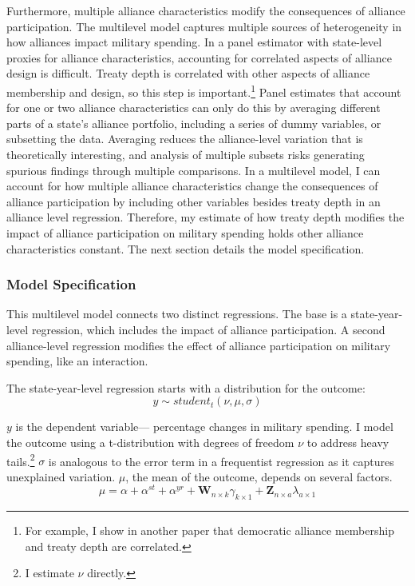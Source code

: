 \documentclass[12pt]{article}
\begin{document}
Furthermore, multiple alliance characteristics modify the consequences of alliance participation.
The multilevel model captures multiple sources of heterogeneity in how alliances impact military spending. 
In a panel estimator with state-level proxies for alliance characteristics, accounting for correlated aspects of alliance design is difficult. 
Treaty depth is correlated with other aspects of alliance membership and design, so this step is important.\footnote{For example, I show in another paper that democratic alliance membership and treaty depth are correlated.}
Panel estimates that account for one or two alliance characteristics can only do this by averaging different parts of a state's alliance portfolio, including a series of dummy variables, or subsetting the data.
Averaging reduces the alliance-level variation that is theoretically interesting, and analysis of multiple subsets risks generating spurious findings through multiple comparisons.  
In a multilevel model, I can account for how multiple alliance characteristics change the consequences of alliance participation by including other variables besides treaty depth in an alliance level regression. 
Therefore, my estimate of how treaty depth modifies the impact of alliance participation on military spending holds other alliance characteristics constant. 
The next section details the model specification. 
 


\subsubsection{Model Specification} 

This multilevel model connects two distinct regressions. 
The base is a state-year-level regression, which includes the impact of alliance participation.
A second alliance-level regression modifies the effect of alliance participation on military spending, like an interaction. 


The state-year-level regression starts with a distribution for the outcome:
\begin{equation}
y \sim student_t(\nu, \mu, \sigma)
\end{equation}
 

$y$ is the dependent variable--- percentage changes in military spending. 
I model the outcome using a t-distribution with degrees of freedom $\nu$ to address heavy tails.\footnote{I estimate $\nu$ directly.}
$\sigma$ is analogous to the error term in a frequentist regression as it captures unexplained variation.  
$\mu$, the mean of the outcome, depends on several factors.
\begin{equation}
\mu = \alpha + \alpha^{st} + \alpha^{yr} +\textbf{W}_{n \times k} \gamma_{k \times 1}  + \textbf{Z}_{n \times a} \lambda_{a \times 1} 
\end{equation}
\end{document}
